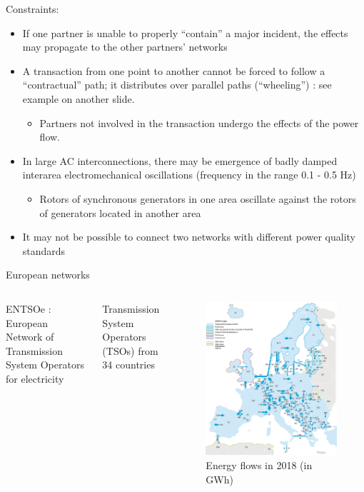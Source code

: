 \begin{frame}
{Constraints:}
\begin{itemize}
\item If one partner is unable to properly “contain” a major incident, the effects may propagate to the other partners’ networks
\item A transaction from one point to another cannot be forced to follow a “contractual” path; it distributes over parallel paths (“wheeling”) : see example on another slide.
\begin{itemize}
\item Partners not involved in the transaction undergo the effects of the power flow.
\end{itemize}
\item In large AC interconnections, there may be emergence of badly damped interarea electromechanical oscillations (frequency in the range 0.1 - 0.5 Hz)
\begin{itemize}
\item Rotors of synchronous generators in one area oscillate against the rotors of generators located in another area
\end{itemize}
\item It may not be possible to connect two networks with different power quality standards
\end{itemize}
\end{frame}

\begin{frame}
{European networks}
\begin{columns}
ENTSOe :
European Network of Transmission System Operators
for electricity
\par{} Transmission System Operators (TSOs) from 34 countries
\begin{figure}
\centering
\includegraphics[width=0.7\linewidth]{images/EU_net_flows.png}
\caption*{Energy flows in 2018 (in GWh)}
\end{figure}
\end{columns}
\end{frame}

